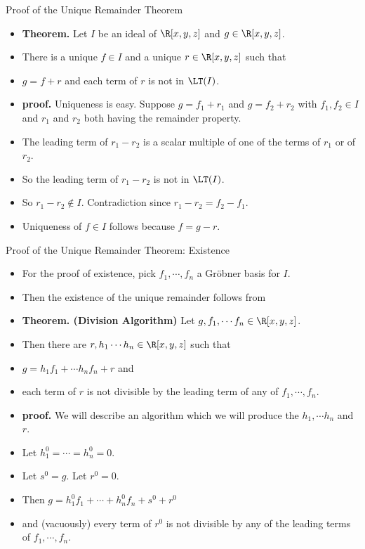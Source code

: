\documentclass{beamer}
\begin{document}
\begin{frame}{Proof of the Unique Remainder Theorem}

\begin{itemize}
  \item \textbf{Theorem.} Let $I$ be an ideal of $\R[x,y,z]$ and $g\in\R[x,y,z]$.
  \item There is a unique $f\in I$ and a unique $r\in\R[x,y,z]$ such that
  \item $g = f + r$  and each term of $r$ is not in $\LT(I)$.
  \item \textbf{proof.} Uniqueness is easy. Suppose $g = f_1 + r_1$ and $g = f_2 + r_2$ with $f_1,f_2\in I$ and $r_1$ and $r_2$ both having the remainder property.
  \item The leading term of $r_1 - r_2$ is a scalar multiple of one of the terms of $r_1$ or of $r_2$.
  \item So the leading term of $r_1 - r_2$ is not in $\LT(I)$.
  \item So $r_1 - r_2 \notin I$. Contradiction since $r_1 - r_2 = f_2 - f_1$.
  \item Uniqueness of $f\in I$ follows because $f=g-r$.
\end{itemize}

\end{frame}

\begin{frame}{Proof of the Unique Remainder Theorem: Existence}

\begin{itemize}
  \item For the proof of existence, pick $f_1,\cdots, f_n$ a Gr\"{o}bner basis for $I$.
  \item Then the existence of the unique remainder follows from
  \item \textbf{Theorem. (Division Algorithm)} Let $g, f_1,\cdots f_n \in \R[x,y,z]$.
  \item Then there are $r,h_1\cdots h_n\in\R[x,y,z]$ such that
  \item $g = h_1 f_1 + \cdots h_n f_n + r$ and
  \item each term of $r$ is not divisible by the leading term of any of $f_1,\cdots,f_n$.
  \item \textbf{proof.} We will describe an algorithm which we will produce the $h_1,\cdots h_n$ and $r$.
  \item Let $h_1^0 = \cdots = h_n^0 = 0$.
  \item Let $s^0 = g$. Let $r^0 = 0$.
  \item Then $g = h_1^0 f_1 + \cdots + h_n^0 f_n + s^0 + r^0$
  \item and (vacuously) every term of $r^0$ is not divisible by any of the leading terms of $f_1,\cdots, f_n$.
\end{itemize}

\end{frame}
\end{document}
